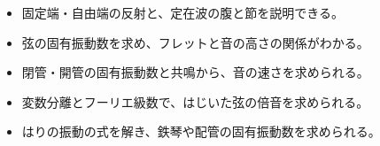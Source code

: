 \makeatletter
\newcommand\rxgmode[5]{%
  \draw[bkGray, line width=0.4pt] (#1,#2) -- ++(#3,0);
  \draw[bkBlue, line width=1.1pt, domain=0:#3, samples=80, smooth] plot ({#1+\x}, {#2+#5*sin(180*#4/#3*\x)});
  \draw[bkBlue!60, line width=0.8pt, dash pattern=on 2pt off 1.2pt, domain=0:#3, samples=80, smooth] plot ({#1+\x}, {#2-#5*sin(180*#4/#3*\x)});
  \fill[bkInk] (#1,#2) circle (0.8) ($(#1,#2)+(#3,0)$) circle (0.8);}
\newcommand\rxgpipe[5]{%
  \fill[bkYellow!18] (#1,#2) rectangle ++(#3,#4);
  \draw[bkInk, line width=0.8pt] (#1,#2) -- ++(#3,0) (#1,#2+#4) -- ++(#3,0);
  \ifnum#5=1 \draw[bkInk, line width=1.6pt] (#1,#2) -- ++(0,#4);\fi}
\newcommand\rxgarrow[2]{\draw[bkRed!80!black, line width=1.2pt, -{Stealth[length=2.6mm, width=2.2mm]}] #1 -- #2;}
\makeatother


\begin{goal}
\begin{itemize}[label={\color{bkTheme}●}, leftmargin=1.6\zw, itemsep=0pt, topsep=1pt]
\item {}\enspace 固定端・自由端の反射と、定在波の腹と節を説明できる。
\item {}\enspace 弦の固有振動数を求め、フレットと音の高さの関係がわかる。
\item {}\enspace 閉管・開管の固有振動数と共鳴から、音の速さを求められる。
\item {}\enspace 変数分離とフーリエ級数で、はじいた弦の倍音を求められる。
\item {}\enspace はりの振動の式を解き、鉄琴や配管の固有振動数を求められる。
\end{itemize}
\end{goal}

